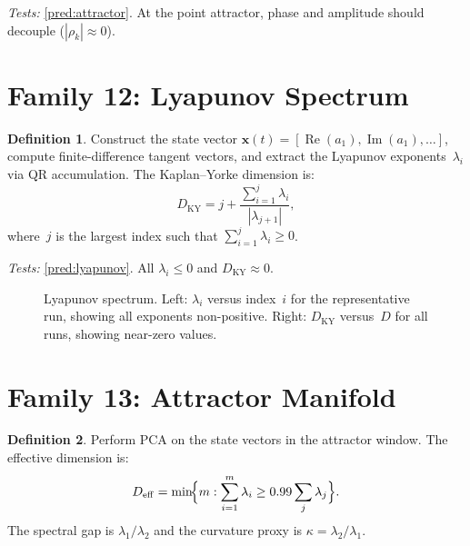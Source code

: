 \documentclass[11pt,twoside,openright]{book}
\theoremstyle{definition}
\newtheorem{definition}{Definition}[chapter]
\theoremstyle{plain}
\theoremstyle{definition}
\theoremstyle{remark}
\begin{document}
\noindent\emph{Tests:} \cref{pred:attractor}. At the point attractor, phase and amplitude should decouple (\(|\rho_k| \approx 0\)).

\section{Family 12: Lyapunov Spectrum}\label{sec:fam-lyap}

\begin{definition}\label{def:lyap}
Construct the state vector \(\mathbf{x}(t) = [\operatorname{Re}(a_1), \operatorname{Im}(a_1), \ldots]\), compute finite-difference tangent vectors, and extract the Lyapunov exponents~\(\lambda_i\) via QR accumulation. The Kaplan--Yorke dimension is:
\begin{equation}\label{eq:KY}
D_{\mathrm{KY}} = j + \frac{\sum_{i=1}^j \lambda_i}{|\lambda_{j+1}|},
\end{equation}
where~\(j\) is the largest index such that \(\sum_{i=1}^j \lambda_i \geq 0\).
\end{definition}

\noindent\emph{Tests:} \cref{pred:lyapunov}. All \(\lambda_i \leq 0\) and \(D_{\mathrm{KY}} \approx 0\).

\begin{figure}[ht]
\centering
\caption{Lyapunov spectrum. Left: \(\lambda_i\) versus index~\(i\) for the representative run, showing all exponents non-positive. Right: \(D_{\mathrm{KY}}\) versus~\(D\) for all runs, showing near-zero values.}
\label{fig:lyapunov}
\end{figure}

\section{Family 13: Attractor Manifold}\label{sec:fam-manifold}

\begin{definition}\label{def:manifold}
Perform PCA on the state vectors in the attractor window. The effective dimension is:
\begin{equation}\label{eq:Deff}
D_{\mathrm{eff}} = \min\!\Bigl\{m : \sum_{i=1}^m \lambda_i \geq 0.99\sum_j \lambda_j\Bigr\}.
\end{equation}
The spectral gap is \(\lambda_1/\lambda_2\) and the curvature proxy is \(\kappa = \lambda_2/\lambda_1\).
\end{definition}
\end{document}
